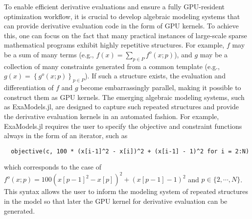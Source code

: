 \documentclass{article}
\begin{document}
To enable efficient derivative evaluations and ensure a fully GPU-resident optimization workflow, it is crucial to develop algebraic modeling systems that can provide derivative evaluation code in the form of GPU kernels.
To achieve this, one can focus on the fact that many practical instances of large-scale sparse mathematical programs exhibit highly repetitive structures. For example, $f$ may be a sum of many terms (e.g., $f(x) = \sum_{p\in P} f^o(x; p)$), and $g$ may be a collection of many constraints generated from a common template (e.g., $g(x) = \left\{g^o(x; p)\right\}_{p\in P}$). If such a structure exists, the evaluation and differentiation of $f$ and $g$ become embarrassingly parallel, making it possible to construct them as GPU kernels. The emerging algebraic modeling systems, such as ExaModels.jl, are designed to capture such repeated structures and provide the derivative evaluation kernels in an automated fashion. For example, ExaModels.jl requires the user to specify the objective and constraint functions always in the form of an iterator, such as
\begin{lstlisting}
  objective(c, 100 * (x[i-1]^2 - x[i])^2 + (x[i-1] - 1)^2 for i = 2:N)
\end{lstlisting}
which corresponds to the case of $f^o(x; p) = 100(x[p-1]^2 - x[p])^2 + (x[p-1]-1)^2$ and $p\in\{2,\cdots,N\}$. This syntax allows the user to inform the modeling system of repeated structures in the model so that later the GPU kernel for derivative evaluation can be generated.
\end{document}
